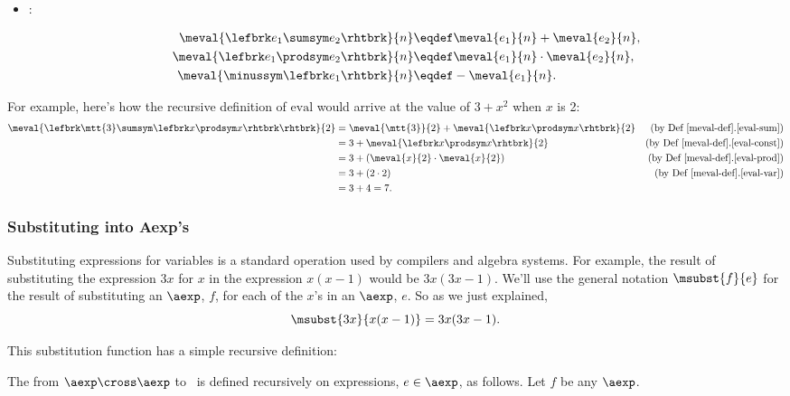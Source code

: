 \begin{definition}
\begin{definition}
\begin{itemize}
\item {}:

\begin{align}
\meval{\lefbrk e_1 \sumsym e_2 \rhtbrk}{n}
   & \eqdef \meval{e_1}{n}+\meval{e_2}{n},\label{eval-sum}\\
\meval{\lefbrk e_1 \prodsym e_2 \rhtbrk}{n}
  & \eqdef \meval{e_1}{n} \cdot \meval{e_2}{n}, \label{eval-prod}\\
\meval{\minussym\lefbrk e_1 \rhtbrk}{n} 
  &  \eqdef - \meval{e_1}{n}. \label{eval-minus}
\end{align}
\end{itemize}

\end{definition}

For example, here's how the recursive definition of $\text{eval}$
would arrive at the value of $3+x^2$ when $x$ is 2:
\begin{align*}
\meval{\lefbrk \mtt{3} \sumsym \lefbrk x \prodsym x\rhtbrk \rhtbrk}{2}
 & = \meval{\mtt{3}}{2} + \meval{\lefbrk x \prodsym x \rhtbrk}{2}
                  & \text{(by~Def~\ref{meval-def}.\ref{eval-sum})}\\
 & = 3 + \meval{\lefbrk x \prodsym x \rhtbrk}{2} & \text{(by~Def~\ref{meval-def}.\ref{eval-const})}\\
 & = 3 + (\meval{x}{2} \cdot \meval{x}{2}) & \text{(by~Def~\ref{meval-def}.\ref{eval-prod})}\\
 & = 3 + (2 \cdot 2) & \text{(by~Def~\ref{meval-def}.\ref{eval-var})}\\
 & = 3 + 4 = 7.
\end{align*}

\subsubsection{Substituting into Aexp's}
Substituting expressions for variables is a standard operation used by
compilers and algebra systems.  For example, the result of substituting
the expression $3x$ for $x$ in the expression $x(x-1)$ would be
$3x(3x-1)$.  We'll use the general notation $\msubst{f}{e}$ for the result
of substituting an $\aexp$, $f$, for each of the $x$'s in an $\aexp$, $e$.
So as we just explained,
\[
\msubst{3x}{x(x-1)} = 3x(3x-1).
\]

This substitution function has a simple recursive definition:

\begin{definition}\label{subst-def}
  The  from $\aexp \cross \aexp$ to \aexp\ is
  defined recursively on expressions, $e \in \aexp$, as follows.  Let $f$
  be any $\aexp$.


\end{definition}
\end{definition}
